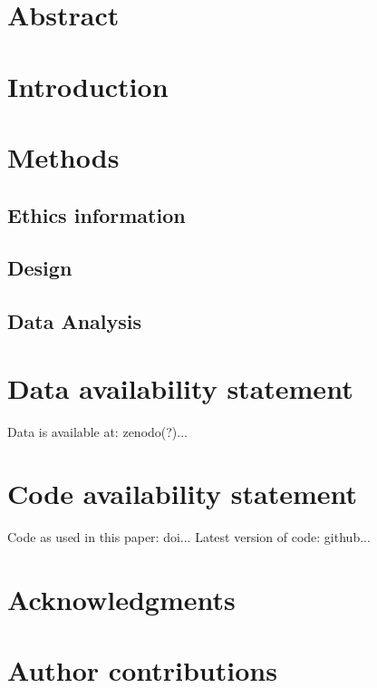\documentclass{article}
\begin{document}

\section{Abstract}


\section{Introduction}


\section{Methods}
\subsection{Ethics information}
\subsection{Design}
\subsection{Data Analysis}

\section{Data availability statement}

Data is available at: zenodo(?)...

\section{Code availability statement}

Code as used in this paper: doi...
Latest version of code: github...

\section{Acknowledgments}

\section{Author contributions}
\end{document}
